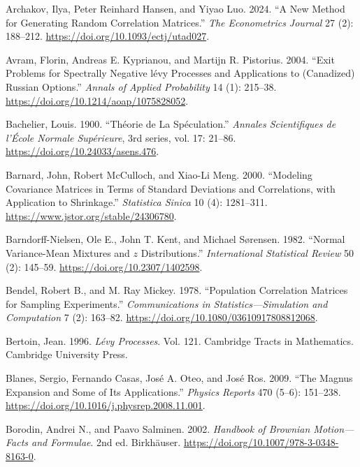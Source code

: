 \documentclass[
  english,
  11pt,
  letterpaper,
  DIV=11,
  numbers=noendperiod]{scrartcl}
\newlength{\cslhangindent}
\newenvironment{CSLReferences}[2] %
 {\begin{list}{}{%
  \setlength{\itemindent}{0pt}
  \setlength{\leftmargin}{0pt}
  \setlength{\parsep}{0pt}
  \ifodd #1
   \setlength{\leftmargin}{\cslhangindent}
   \setlength{\itemindent}{-1\cslhangindent}
  \fi
  \setlength{\itemsep}{#2\baselineskip}}}
 {\end{list}}
\theoremstyle{plain}
\theoremstyle{plain}
\theoremstyle{plain}
\theoremstyle{plain}
\theoremstyle{remark}
\begin{document}
\begin{CSLReferences}{1}{1}
Archakov, Ilya, Peter Reinhard Hansen, and Yiyao Luo. 2024. {``A New
Method for Generating Random Correlation Matrices.''} \emph{The
Econometrics Journal} 27 (2): 188--212.
\url{https://doi.org/10.1093/ectj/utad027}.

Avram, Florin, Andreas E. Kyprianou, and Martijn R. Pistorius. 2004.
{``Exit Problems for Spectrally Negative l{é}vy Processes and
Applications to (Canadized) Russian Options.''} \emph{Annals of Applied
Probability} 14 (1): 215--38.
\url{https://doi.org/10.1214/aoap/1075828052}.

Bachelier, Louis. 1900. {``Th{é}orie de La Sp{é}culation.''}
\emph{Annales Scientifiques de l'{É}cole Normale Sup{é}rieure}, 3rd
series, vol. 17: 21--86. \url{https://doi.org/10.24033/asens.476}.

Barnard, John, Robert McCulloch, and Xiao-Li Meng. 2000. {``Modeling
Covariance Matrices in Terms of Standard Deviations and Correlations,
with Application to Shrinkage.''} \emph{Statistica Sinica} 10 (4):
1281--311. \url{https://www.jstor.org/stable/24306780}.

Barndorff-Nielsen, Ole E., John T. Kent, and Michael Sørensen. 1982.
{``Normal Variance-Mean Mixtures and {\(z\)} Distributions.''}
\emph{International Statistical Review} 50 (2): 145--59.
\url{https://doi.org/10.2307/1402598}.

Bendel, Robert B., and M. Ray Mickey. 1978. {``Population Correlation
Matrices for Sampling Experiments.''} \emph{Communications in
Statistics---Simulation and Computation} 7 (2): 163--82.
\url{https://doi.org/10.1080/03610917808812068}.

Bertoin, Jean. 1996. \emph{L{é}vy Processes}. Vol. 121. Cambridge Tracts
in Mathematics. Cambridge University Press.

Blanes, Sergio, Fernando Casas, José A. Oteo, and José Ros. 2009. {``The
Magnus Expansion and Some of Its Applications.''} \emph{Physics Reports}
470 (5--6): 151--238.
\url{https://doi.org/10.1016/j.physrep.2008.11.001}.

Borodin, Andrei N., and Paavo Salminen. 2002. \emph{Handbook of Brownian
Motion---Facts and Formulae}. 2nd ed. Birkh{ä}user.
\url{https://doi.org/10.1007/978-3-0348-8163-0}.


\end{CSLReferences}
\end{document}
